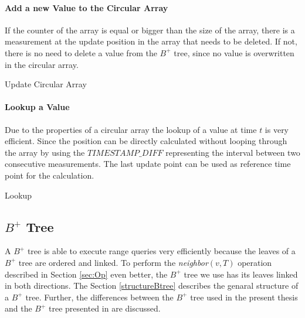 \documentclass[abstracton,12pt]{scrreprt}
\begin{document}
\paragraph{Add a new Value to the Circular Array}
If the counter of the array is equal or bigger than the size of the array, there is a measurement at the update position in the array that needs to be deleted. If not, there is no need to delete a value from the $B^+$ tree, since no value is overwritten in the circular array. 

\begin{algorithm}[ht!]
	
	\caption{Update Circular Array}
\end{algorithm}

\newpage

\paragraph{Lookup a Value}
Due to the properties of a circular array the lookup of a value at time $t$ is very efficient. Since the position can be directly calculated without looping through the array by using the $TIMESTAMP\_DIFF$ representing the interval between two consecutive measurements. The last update point can be used as reference time point for the calculation. 

\begin{algorithm}[ht!]
	
	\caption{Lookup}
\end{algorithm}


\subsection{$B^+$ Tree}
A $B^+$ tree is able to execute range queries very efficiently because the leaves of a $B^+$ tree are ordered and linked. To perform the \emph{neighbor}$(v,T)$ operation described in Section \ref{sec:Op} even better, the $B^+$ tree we use has its leaves linked in both directions. The Section \ref{structureBtree} describes the genaral structure of a $B^+$ tree. Further, the differences between the $B^+$ tree used in the present thesis and the $B^+$ tree presented in \cite{BTreeBook} are discussed. 
\end{document}
